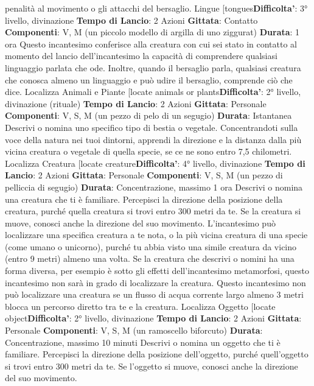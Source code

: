 \begin{multicols}{2}
penalità al movimento o gli attacchi del bersaglio.
Lingue
[tongues\textbf{Difficolta'}:
3° livello, divinazione
\textbf{Tempo di Lancio}: 2 Azioni
\textbf{Gittata}: Contatto
\textbf{Componenti}: V, M (un piccolo modello di argilla di uno
ziggurat)
\textbf{Durata}: 1 ora
Questo incantesimo conferisce alla creatura con cui sei
stato in contatto al momento del lancio dell’incantesimo
la capacità di comprendere qualsiasi linguaggio parlata
che ode. Inoltre, quando il bersaglio parla, qualsiasi
creatura che conosca almeno un linguaggio e può udire
il bersaglio, comprende ciò che dice.
Localizza Animali e Piante
[locate animals or plants\textbf{Difficolta'}:
2° livello, divinazione (rituale)
\textbf{Tempo di Lancio}: 2 Azioni
\textbf{Gittata}: Personale
\textbf{Componenti}: V, S, M (un pezzo di pelo di un segugio)
\textbf{Durata}: Istantanea
Descrivi o nomina uno specifico tipo di bestia o
vegetale. Concentrandoti sulla voce della natura nei
tuoi dintorni, apprendi la direzione e la distanza dalla
più vicina creatura o vegetale di quella specie, se ce ne
sono entro 7,5 chilometri.
Localizza Creatura
[locate creature\textbf{Difficolta'}:
4° livello, divinazione
\textbf{Tempo di Lancio}: 2 Azioni
\textbf{Gittata}: Personale
\textbf{Componenti}: V, S, M (un pezzo di pelliccia di segugio)
\textbf{Durata}: Concentrazione, massimo 1 ora
Descrivi o nomina una creatura che ti è familiare.
Percepisci la direzione della posizione della creatura,
purché quella creatura si trovi entro 300 metri da te. Se
la creatura si muove, conosci anche la direzione del
suo movimento.
L’incantesimo può localizzare una specifica creatura a
te nota, o la più vicina creatura di una specie (come
umano o unicorno), purché tu abbia visto una simile
creatura da vicino (entro 9 metri) almeno una volta. Se
la creatura che descrivi o nomini ha una forma diversa,
per esempio è sotto gli effetti dell’incantesimo
metamorfosi, questo incantesimo non sarà in grado di
localizzare la creatura.
Questo incantesimo non può localizzare una creatura
se un flusso di acqua corrente largo almeno 3 metri
blocca un percorso diretto tra te e la creatura.
Localizza Oggetto
[locate object\textbf{Difficolta'}:
2° livello, divinazione
\textbf{Tempo di Lancio}: 2 Azioni
\textbf{Gittata}: Personale
\textbf{Componenti}: V, S, M (un ramoscello biforcuto)
\textbf{Durata}: Concentrazione, massimo 10 minuti
Descrivi o nomina un oggetto che ti è familiare.
Percepisci la direzione della posizione dell’oggetto,
purché quell’oggetto si trovi entro 300 metri da te. Se
l’oggetto si muove, conosci anche la direzione del suo
movimento.

\end{multicols}
